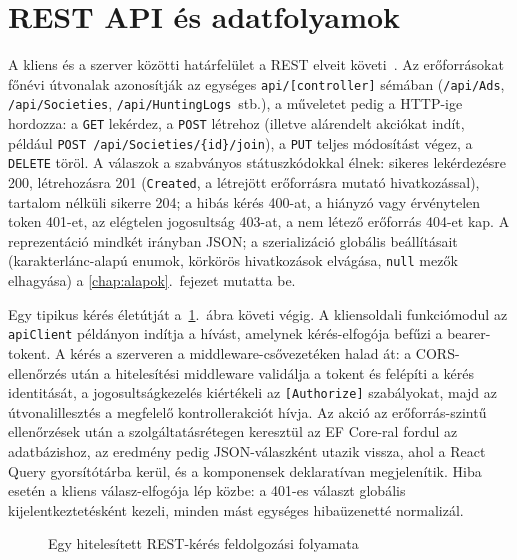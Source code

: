 \section{REST API és adatfolyamok}
\label{sec:arch-rest}

A kliens és a szerver közötti határfelület a REST elveit követi~\cite{fielding2000}. Az
erőforrásokat főnévi útvonalak azonosítják az egységes \texttt{api/[controller]} sémában
(\texttt{/api/Ads}, \texttt{/api/Societies}, \texttt{/api/HuntingLogs}~stb.), a műveletet pedig
a HTTP-ige hordozza: a \texttt{GET} lekérdez, a \texttt{POST} létrehoz (illetve alárendelt
akciókat indít, például \texttt{POST /api/Societies/\{id\}/join}), a \texttt{PUT} teljes
módosítást végez, a \texttt{DELETE} töröl. A válaszok a szabványos státuszkódokkal élnek:
sikeres lekérdezésre 200, létrehozásra 201 (\texttt{Created}, a létrejött erőforrásra mutató
hivatkozással), tartalom nélküli sikerre 204; a hibás kérés 400-at, a hiányzó vagy érvénytelen
token 401-et, az elégtelen jogosultság 403-at, a nem létező erőforrás 404-et kap. A
reprezentáció mindkét irányban JSON; a szerializáció globális beállításait (karakterlánc-alapú
enumok, körkörös hivatkozások elvágása, \texttt{null} mezők elhagyása) a
\ref{chap:alapok}.~fejezet mutatta be.

Egy tipikus kérés életútját a~\ref{fig:request-flow}.~ábra követi végig. A kliensoldali
funkciómodul az \texttt{apiClient} példányon indítja a hívást, amelynek kérés-elfogója befűzi
a bearer-tokent. A kérés a szerveren a middleware-csővezetéken halad át: a CORS-ellenőrzés után
a hitelesítési middleware validálja a tokent és felépíti a kérés identitását, a
jogosultságkezelés kiértékeli az \texttt{[Authorize]} szabályokat, majd az útvonalillesztés a
megfelelő kontrollerakciót hívja. Az akció az erőforrás-szintű ellenőrzések után a
szolgáltatásrétegen keresztül az EF Core-ral fordul az adatbázishoz, az eredmény pedig
JSON-válaszként utazik vissza, ahol a React Query gyorsítótárba kerül, és a komponensek
deklaratívan megjelenítik. Hiba esetén a kliens válasz-elfogója lép közbe: a 401-es választ
globális kijelentkeztetésként kezeli, minden mást egységes hibaüzenetté normalizál.

\begin{figure}[htbp]
	\centering
	\caption{Egy hitelesített REST-kérés feldolgozási folyamata}
	\label{fig:request-flow}
\end{figure}

